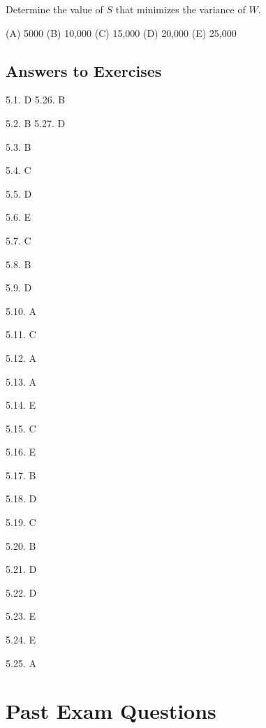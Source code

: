 \documentclass[]{book}
\begin{document}
Determine the value of \(S\) that minimizes the variance of \(W\).

(A) 5000 (B) 10,000 (C) 15,000 (D) 20,000 (E) 25,000

\subsection{Answers to Exercises}\label{answers-to-exercises-2}

5.1. D 5.26. B

5.2. B 5.27. D

5.3. B

5.4. C

5.5. D

5.6. E

5.7. C

5.8. B

5.9. D

5.10. A

5.11. C

5.12. A

5.13. A

5.14. E

5.15. C

5.16. E

5.17. B

5.18. D

5.19. C

5.20. B

5.21. D

5.22. D

5.23. E

5.24. E

5.25. A

\section{Past Exam Questions}\label{past-exam-questions-2}
\end{document}
